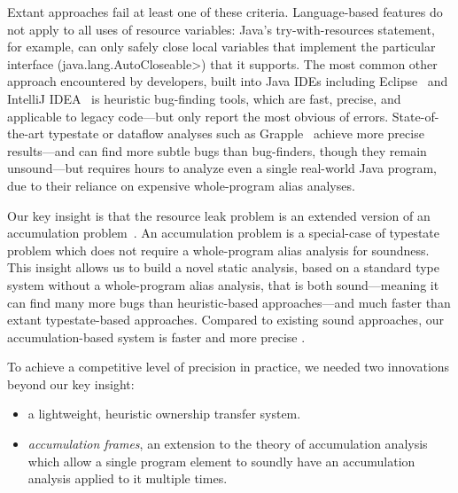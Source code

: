 Extant approaches fail at least one of these criteria.
Language-based features do not apply to all uses of resource variables:
Java's try-with-resources statement, for example, can
only safely close local variables that implement the particular
interface (\<java.lang.AutoCloseable>) that it supports.
The most common other
approach encountered by developers, built into Java IDEs including
Eclipse~\cite{ecj-resource-leak} and IntelliJ
IDEA~\cite{idea-resource-leak} is heuristic bug-finding tools, which
are fast, precise, and applicable to legacy code---but only report the most obvious of
errors. State-of-the-art typestate or dataflow analyses such as
Grapple~\cite{zuo2019grapple} achieve more precise results---and
can find more subtle bugs than bug-finders, though they remain unsound---but
requires hours to analyze even a single real-world Java program, due
to their reliance on expensive whole-program alias analyses.

Our key insight is that the resource leak problem is an extended
version of an accumulation problem~\cite{kellogg20verifying}. An
accumulation problem is a special-case of typestate problem which does
not require a whole-program alias analysis for soundness.  This
insight allows us to build a novel static analysis, based on a
standard type system without a whole-program alias analysis, that is
both sound---meaning it can find many more bugs than heuristic-based
approaches---and much faster than extant typestate-based approaches.
Compared to existing sound approaches, our accumulation-based system
is faster and more precise .

To achieve a competitive level of precision in practice, we needed two
innovations beyond our key insight:
\begin{itemize}
\item a lightweight, heuristic ownership transfer system.
\item \emph{accumulation frames}, an extension to the theory of
  accumulation analysis which allow a single program element to
  soundly have an accumulation analysis applied to it multiple times.
\end{itemize}

